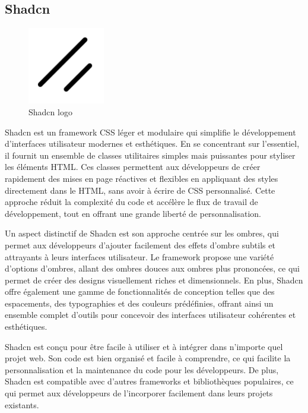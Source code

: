 \documentclass[a4paper,12pt]{report}
\numberwithin{equation}{section}
\begin{document}
\subsection{Shadcn}
\begin{figure}[H]
    \centering
    \includegraphics[width=0.3\textwidth]{tech/shadcn.png}
    \caption{Shadcn logo}
    \label{fig:Shadcn logo}
\end{figure}
\par
Shadcn est un framework CSS léger et modulaire qui simplifie le développement d'interfaces utilisateur modernes et esthétiques. En se concentrant sur l'essentiel, il fournit un ensemble de classes utilitaires simples mais puissantes pour styliser les éléments HTML. Ces classes permettent aux développeurs de créer rapidement des mises en page réactives et flexibles en appliquant des styles directement dans le HTML, sans avoir à écrire de CSS personnalisé. Cette approche réduit la complexité du code et accélère le flux de travail de développement, tout en offrant une grande liberté de personnalisation.
\\ \par
Un aspect distinctif de Shadcn est son approche centrée sur les ombres, qui permet aux développeurs d'ajouter facilement des effets d'ombre subtils et attrayants à leurs interfaces utilisateur. Le framework propose une variété d'options d'ombres, allant des ombres douces aux ombres plus prononcées, ce qui permet de créer des designs visuellement riches et dimensionnels. En plus, Shadcn offre également une gamme de fonctionnalités de conception telles que des espacements, des typographies et des couleurs prédéfinies, offrant ainsi un ensemble complet d'outils pour concevoir des interfaces utilisateur cohérentes et esthétiques.
\\ \par
Shadcn est conçu pour être facile à utiliser et à intégrer dans n'importe quel projet web. Son code est bien organisé et facile à comprendre, ce qui facilite la personnalisation et la maintenance du code pour les développeurs. De plus, Shadcn est compatible avec d'autres frameworks et bibliothèques populaires, ce qui permet aux développeurs de l'incorporer facilement dans leurs projets existants. 
\newpage
\end{document}
